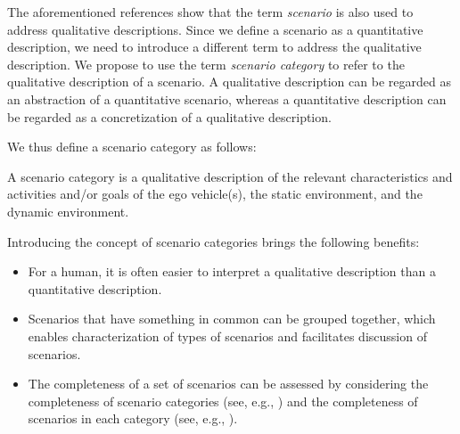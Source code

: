 The aforementioned references \autocite{USDoT2007precrashscenarios, adaptive2017d73, opdencamp2014cats, lenard2014typical, catapult2017taxonomy} show that the term \emph{scenario} is also used to address qualitative descriptions. Since we define a scenario as a quantitative description, we need to introduce a different term to address the qualitative description. We propose to use the term \emph{scenario category} to refer to the qualitative description of a scenario. A qualitative description can be regarded as an abstraction of a quantitative scenario, whereas a quantitative description can be regarded as a concretization of a qualitative description.

We thus define a scenario category as follows:
\begin{definition} \label{def:scenario category}	
	\cstartd A scenario category is a qualitative description of the relevant characteristics and activities and/or goals of the ego vehicle(s), the static environment, and the dynamic environment. \cendd
\end{definition}

Introducing the concept of scenario categories brings the following benefits:
\begin{itemize}
	\item For a human, it is \cstartd often \cendd easier to interpret a qualitative description than a quantitative description.
	\item \cstartd Scenarios that have something in common can be grouped together, which enables characterization of types of scenarios and facilitates discussion of scenarios. \cendd
	\item \cstartd The completeness of a set of scenarios can be assessed by considering the completeness of scenario categories (see, e.g., \autocite{hauer2019didwe}) and the completeness of scenarios in each category (see, e.g., \autocite{degelder2019completeness}). \cendd
\end{itemize}

